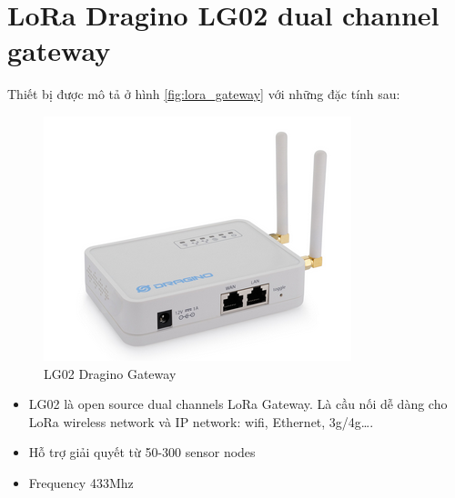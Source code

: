\section{LoRa Dragino LG02 dual channel gateway}
Thiết bị được mô tả ở hình \ref{fig:lora_gateway} với những đặc tính sau:
\begin{figure}[H]
    \includegraphics[width=\textwidth]{images/Quanh/lora_gateway.png}
    \caption{LG02 Dragino Gateway}
    \label{fig:lorawan_gateway}
\end{figure}

\begin{itemize}
    \item LG02 là open source dual channels LoRa Gateway. Là cầu nối dễ dàng cho LoRa wireless network và IP network: wifi, Ethernet, 3g/4g\dots .
    \item Hỗ trợ giải quyết từ 50-300 sensor nodes
    \item Frequency 433Mhz
\end{itemize}


